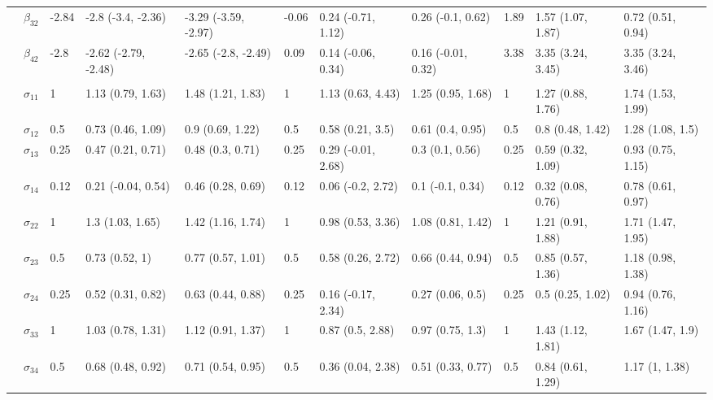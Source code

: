 \documentclass{article}
\begin{document}
\begin{landscape}
\begin{table}[t]
\begin{tabular}{lllllllllll}
\hspace{1em} & $\beta_{32}$ & -2.84 & -2.8 (-3.4, -2.36) & -3.29 (-3.59, -2.97) & -0.06 & 0.24 (-0.71, 1.12) & 0.26 (-0.1, 0.62) & 1.89 & 1.57 (1.07, 1.87) & 0.72 (0.51, 0.94)\\
\hspace{1em} & $\beta_{42}$ & -2.8 & -2.62 (-2.79, -2.48) & -2.65 (-2.8, -2.49) & 0.09 & 0.14 (-0.06, 0.34) & 0.16 (-0.01, 0.32) & 3.38 & 3.35 (3.24, 3.45) & 3.35 (3.24, 3.46)\\
\addlinespace[0.3em]
\multicolumn{11}{l}{\textbf{ }}\\
\hspace{1em} & $\sigma_{11}$ & 1 & 1.13 (0.79, 1.63) & 1.48 (1.21, 1.83) & 1 & 1.13 (0.63, 4.43) & 1.25 (0.95, 1.68) & 1 & 1.27 (0.88, 1.76) & 1.74 (1.53, 1.99)\\
\hspace{1em} & $\sigma_{12}$ & 0.5 & 0.73 (0.46, 1.09) & 0.9 (0.69, 1.22) & 0.5 & 0.58 (0.21, 3.5) & 0.61 (0.4, 0.95) & 0.5 & 0.8 (0.48, 1.42) & 1.28 (1.08, 1.5)\\
\hspace{1em} & $\sigma_{13}$ & 0.25 & 0.47 (0.21, 0.71) & 0.48 (0.3, 0.71) & 0.25 & 0.29 (-0.01, 2.68) & 0.3 (0.1, 0.56) & 0.25 & 0.59 (0.32, 1.09) & 0.93 (0.75, 1.15)\\
\hspace{1em} & $\sigma_{14}$ & 0.12 & 0.21 (-0.04, 0.54) & 0.46 (0.28, 0.69) & 0.12 & 0.06 (-0.2, 2.72) & 0.1 (-0.1, 0.34) & 0.12 & 0.32 (0.08, 0.76) & 0.78 (0.61, 0.97)\\
\hspace{1em} & $\sigma_{22}$ & 1 & 1.3 (1.03, 1.65) & 1.42 (1.16, 1.74) & 1 & 0.98 (0.53, 3.36) & 1.08 (0.81, 1.42) & 1 & 1.21 (0.91, 1.88) & 1.71 (1.47, 1.95)\\
\hspace{1em} & $\sigma_{23}$ & 0.5 & 0.73 (0.52, 1) & 0.77 (0.57, 1.01) & 0.5 & 0.58 (0.26, 2.72) & 0.66 (0.44, 0.94) & 0.5 & 0.85 (0.57, 1.36) & 1.18 (0.98, 1.38)\\
\hspace{1em} & $\sigma_{24}$ & 0.25 & 0.52 (0.31, 0.82) & 0.63 (0.44, 0.88) & 0.25 & 0.16 (-0.17, 2.34) & 0.27 (0.06, 0.5) & 0.25 & 0.5 (0.25, 1.02) & 0.94 (0.76, 1.16)\\
\hspace{1em} & $\sigma_{33}$ & 1 & 1.03 (0.78, 1.31) & 1.12 (0.91, 1.37) & 1 & 0.87 (0.5, 2.88) & 0.97 (0.75, 1.3) & 1 & 1.43 (1.12, 1.81) & 1.67 (1.47, 1.9)\\
\hspace{1em} & $\sigma_{34}$ & 0.5 & 0.68 (0.48, 0.92) & 0.71 (0.54, 0.95) & 0.5 & 0.36 (0.04, 2.38) & 0.51 (0.33, 0.77) & 0.5 & 0.84 (0.61, 1.29) & 1.17 (1, 1.38)\\

\end{tabular}
\end{table}
\end{landscape}
\end{document}
